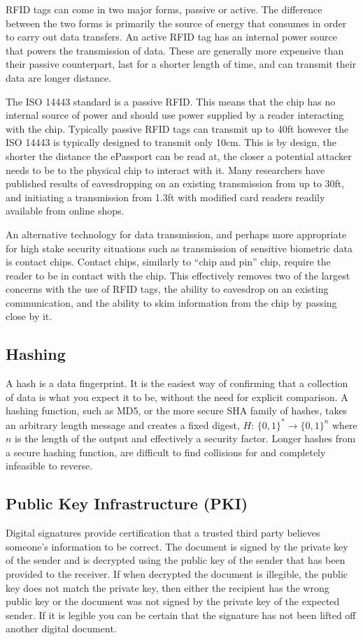 \documentclass[12pt]{article}
\begin{document}
RFID tags can come in two major forms, passive or active. The difference between the two forms is primarily the source of energy that consumes in order to carry out data transfers. An active RFID tag has an internal power source that powers the transmission of data. These are generally more expensive than their passive counterpart, last for a shorter length of time, and can transmit their data are longer distance.

The ISO 14443 standard is a passive RFID. This means that the chip has no internal source of power and should use power supplied by a reader interacting with the chip. Typically passive RFID tags can transmit up to 40ft however the ISO 14443 is typically designed to transmit only 10cm. This is by design, the shorter the distance the ePassport can be read at, the closer a potential attacker needs to be to the physical chip to interact with it. Many researchers have published results of eavesdropping on an existing transmission from up to 30ft, and initiating a transmission from 1.3ft \cite{Kfir:2005tv,Yoshida:2004ta} with modified card readers readily available from online shops.

An alternative technology for data transmission, and perhaps more appropriate for high stake security situations such as transmission of sensitive biometric data is contact chips. Contact chips, similarly to ``chip and pin'' chip, require the reader to be in contact with the chip. This effectively removes two of the largest concerns with the use of RFID tags, the ability to eavesdrop on an existing communication, and the ability to skim information from the chip by passing close by it.

\subsection{Hashing}
\label{sec:hashing}
A hash is a data fingerprint. It is the easiest way of confirming that a collection of data is what you expect it to be, without the need for explicit comparison. A hashing function, such as MD5, or the more secure SHA family of hashes, takes an arbitrary length message and creates a fixed digest, $H$: $\{0,1\}^* \rightarrow \{0,1\}^n$ where $n$ is the length of the output and effectively a security factor. Longer hashes from a secure hashing function, are difficult to find collisions for and completely infeasible to reverse.

\subsection{Public Key Infrastructure (PKI)}
\label{sec:PKI}
Digital signatures provide certification that a trusted third party believes someone's information to be correct. The document is signed by the private key of the sender and is decrypted using the public key of the sender that has been provided to the receiver. If when decrypted the document is illegible, the public key does not match the private key, then either the recipient has the wrong public key or the document was not signed by the private key of the expected sender. If it is legible you can be certain that the signature has not been lifted off another digital document.
\end{document}
